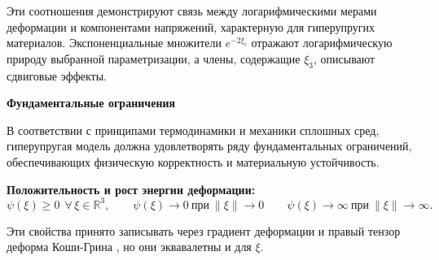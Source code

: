 Эти соотношения демонстрируют связь между логарифмическими мерами деформации и компонентами напряжений, 
характерную для гиперупругих материалов. 
Экспоненциальные множители $e^{-2\xi_i}$ отражают логарифмическую природу выбранной параметризации, 
а члены, содержащие $\xi_3$, описывают сдвиговые эффекты.

\textbf{Фундаментальные ограничения}

В соответствии с принципами термодинамики и механики сплошных сред, 
гиперупругая модель должна удовлетворять ряду фундаментальных ограничений, обеспечивающих физическую корректность и 
материальную устойчивость.

\textbf{Положительность и рост энергии деформации:}
\begin{equation}
 \psi(\xi) \ge 0\ \ \forall\,\xi\in\mathbb{R}^3,
 \qquad \psi(\xi) \to 0\ \text{при}\ \lVert\xi\rVert\to 0
 \qquad \psi(\xi) \to \infty\ \text{при}\ \lVert\xi\rVert\to\infty.
\label{eq:energy_constraints}
\end{equation}

Эти свойства принято записывать через градиент деформации и правый тензор деформа Коши-Грина \cite{antman2005nonlin}, но они эквавалетны и для $\xi$.






